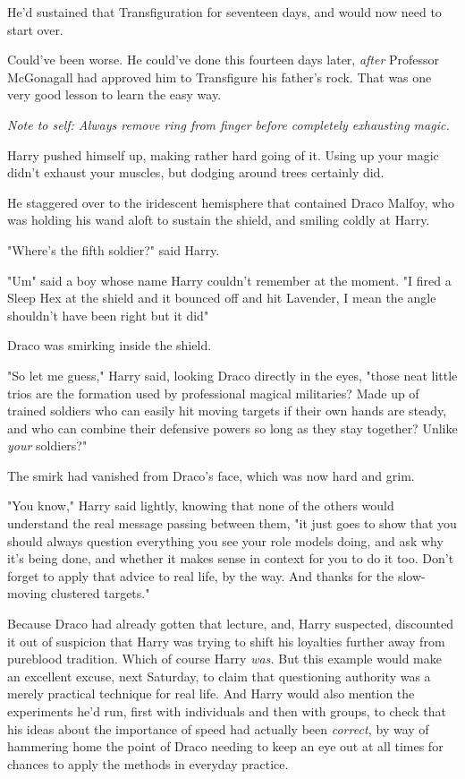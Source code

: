 He'd sustained that Transfiguration for seventeen days, and would now need to
start over.

Could've been worse. He could've done this fourteen days later, \emph{after}
Professor McGonagall had approved him to Transfigure his father's rock. That
was one very good lesson to learn the easy way.

\emph{Note to self: Always remove ring from finger before completely exhausting
magic.}

Harry pushed himself up, making rather hard going of it. Using up your magic
didn't exhaust your muscles, but dodging around trees certainly did.

He staggered over to the iridescent hemisphere that contained Draco Malfoy, who
was holding his wand aloft to sustain the shield, and smiling coldly at Harry.

"Where's the fifth soldier?" said Harry.

"Um{\el}" said a boy whose name Harry couldn't remember at the moment. "I
fired a Sleep Hex at the shield and it bounced off and hit Lavender, I mean the
angle shouldn't have been right but it did{\el}"

Draco was smirking inside the shield.

"So let me guess," Harry said, looking Draco directly in the eyes, "those neat
little trios are the formation used by professional magical militaries? Made up
of trained soldiers who can easily hit moving targets if their own hands are
steady, and who can combine their defensive powers so long as they stay
together? Unlike \emph{your} soldiers?"

The smirk had vanished from Draco's face, which was now hard and grim.

"You know," Harry said lightly, knowing that none of the others would
understand the real message passing between them, "it just goes to show that
you should always question everything you see your role models doing, and ask
why it's being done, and whether it makes sense in context for you to do it
too. Don't forget to apply that advice to real life, by the way. And thanks for
the slow-moving clustered targets."

Because Draco had already gotten that lecture, and, Harry suspected, discounted
it out of suspicion that Harry was trying to shift his loyalties further away
from pureblood tradition. Which of course Harry \emph{was.} But this example
would make an excellent excuse, next Saturday, to claim that questioning
authority was a merely practical technique for real life. And Harry would also
mention the experiments he'd run, first with individuals and then with groups,
to check that his ideas about the importance of speed had actually been
\emph{correct,} by way of hammering home the point of Draco needing to keep an
eye out at all times for chances to apply the methods in everyday practice.

